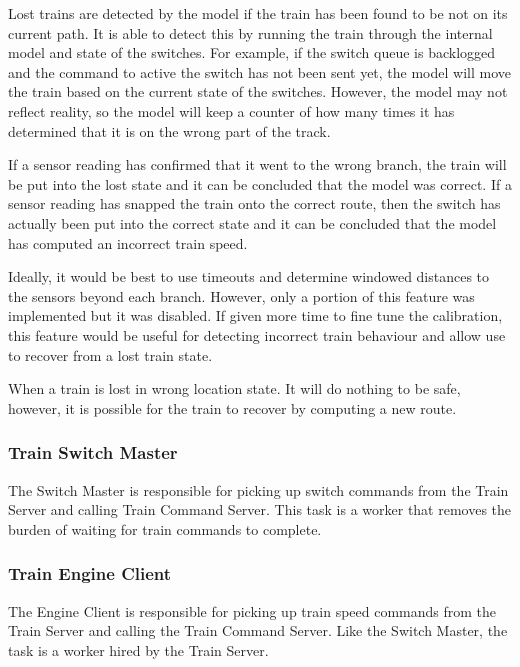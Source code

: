 \documentclass[letterpaper]{article}
\begin{document}
Lost trains are detected by the model if the train has been found to be not on its current path. It is able to detect this by running the train through the internal model and state of the switches. For example, if the switch queue is backlogged and the command to active the switch has not been sent yet, the model will move the train based on the current state of the switches. However, the model may not reflect reality, so the model will keep a counter of how many times it has determined that it is on the wrong part of the track.

If a sensor reading has confirmed that it went to the wrong branch, the train will be put into the lost state and it can be concluded that the model was correct. If a sensor reading has snapped the train onto the correct route, then the switch has actually been put into the correct state and it can be concluded that the model has computed an incorrect train speed.

Ideally, it would be best to use timeouts and determine windowed distances to the sensors beyond each branch. However, only a portion of this feature was implemented but it was disabled. If given more time to fine tune the calibration, this feature would be useful for detecting incorrect train behaviour and allow use to recover from a lost train state.

When a train is lost in wrong location state. It will do nothing to be safe, however, it is possible for the train to recover by computing a new route.


\subsubsection{Train Switch Master%
  \label{train-switch-master}%
}

The Switch Master is responsible for picking up switch commands from the Train Server and calling Train Command Server. This task is a worker that removes the burden of waiting for train commands to complete.


\subsubsection{Train Engine Client%
  \label{train-engine-client}%
}

The Engine Client is responsible for picking up train speed commands from the Train Server and calling the Train Command Server. Like the Switch Master, the task is a worker hired by the Train Server.
\end{document}
